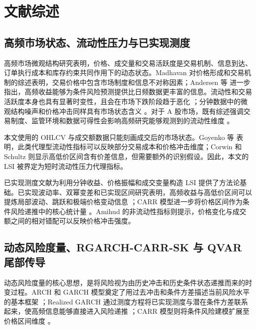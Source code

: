 \documentclass[12pt,a4paper]{ctexart}
\begin{document}
\section{文献综述}

\subsection{高频市场状态、流动性压力与已实现测度}

高频市场微观结构研究表明，价格、成交量和交易活跃度是交易机制、信息到达、订单执行成本和库存约束共同作用下的动态状态。Madhavan \cite{madhavan2000survey} 对价格形成和交易机制的综述表明，交易价格中包含市场制度和信息不对称因素；Andersen 等 \cite{andersen2003realized} 进一步指出，高频收益能够为条件风险预测提供比日频数据更丰富的信息。流动性和交易活跃度本身也具有显著时变性，且会在市场下跌阶段趋于恶化 \cite{chordia2001liquidity}；分钟数据中的微观结构噪声和价格冲击同样具有市场状态含义 \cite{aitsahalia2009noise}。对于 A 股市场，既有综述强调交易制度、监管环境和数据可得性会影响高频研究能够观测到的流动性维度 \cite{peng2024chinamicrostructure}。

本文使用的 OHLCV 与成交额数据只能刻画成交后的市场状态。Goyenko 等 \cite{goyenko2009liquidity} 表明，此类代理型流动性指标可以反映部分交易成本和价格冲击维度；Corwin 和 Schultz \cite{corwin2012spread} 则显示高低价区间含有价差信息，但需要额外的识别假设。因此，本文的 LSI 被界定为短时流动性压力代理指标。

已实现测度文献为利用分钟收益、价格振幅和成交变量构造 LSI 提供了方法论基础。已实现波动率、双幂变差和已实现区间研究表明，高频收益与高低价区间可以提炼局部波动、跳跃和极端价格变动信息 \cite{andersen2003realized,barndorff2004bipower,martens2007range}；CARR 模型进一步将价格区间作为条件风险递推中的核心统计量 \cite{chou2005carr}。Amihud \cite{amihud2002illiquidity} 的非流动性指标则提示，价格变化与成交额之间的相对错配可以反映价格冲击强度。

\subsection{动态风险度量、RGARCH-CARR-SK 与 QVAR 尾部传导}

动态风险度量的核心思想，是将风险视为由历史冲击和历史条件状态递推而来的时变过程。ARCH 和 GARCH 模型奠定了用过去冲击和条件方差描述当前风险水平的基本框架 \cite{engle1982arch,bollerslev1986garch}；Realized GARCH 通过测度方程将已实现测度与潜在条件方差联系起来，使高频信息能够直接进入风险递推 \cite{hansen2012realizedgarch}；CARR 模型则将条件风险建模扩展至价格区间维度 \cite{chou2005carr}。
\end{document}
